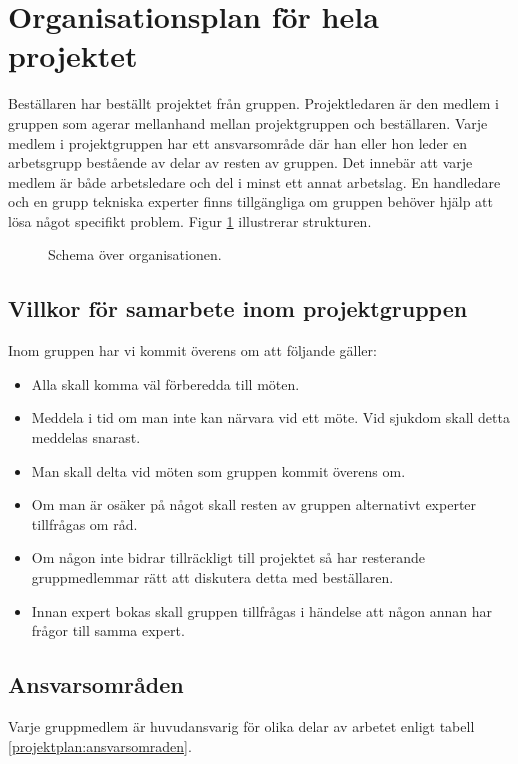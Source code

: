 \section{Organisationsplan för hela projektet}
Beställaren har beställt projektet från gruppen. Projektledaren är den medlem i gruppen som agerar mellanhand mellan projektgruppen och beställaren. Varje medlem i projektgruppen har ett ansvarsområde där han eller hon leder en arbetsgrupp bestående av delar av resten av gruppen. Det innebär att varje medlem är både arbetsledare och del i minst ett annat arbetslag. En handledare och en grupp tekniska experter finns tillgängliga om gruppen behöver hjälp att lösa något specifikt problem. Figur \ref{projektplan:organisationsplan} illustrerar strukturen.

\begin{figure}[h!]
\center
{}%

%
\caption{Schema över organisationen.} \label{projektplan:organisationsplan}
\endcenter
\end{figure}

\subsection{Villkor för samarbete inom projektgruppen}
Inom gruppen har vi kommit överens om att följande gäller:
\begin{itemize}
\item{Alla skall komma väl förberedda till möten.}
\item{Meddela i tid om man inte kan närvara vid ett möte. Vid sjukdom skall detta meddelas snarast.}
\item{Man skall delta vid möten som gruppen kommit överens om.}
\item{Om man är osäker på något skall resten av gruppen alternativt experter tillfrågas om råd.}
\item{Om någon inte bidrar tillräckligt till projektet så har resterande gruppmedlemmar rätt att diskutera detta med beställaren.}
\item{Innan expert bokas skall gruppen tillfrågas i händelse att någon annan har frågor till samma expert.}
\end{itemize}

\subsection{Ansvarsområden}
Varje gruppmedlem är huvudansvarig för olika delar av arbetet enligt tabell \ref{projektplan:ansvarsomraden}.

